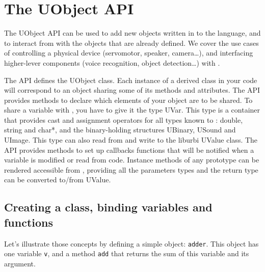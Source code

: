 \chapter{The UObject API}
\label{sec:uob:api}

The UObject API can be used to add new objects written in \Cxx to the
\us language, and to interact from \Cxx with the objects that are
already defined. We cover the use cases of controlling a physical
device (servomotor, speaker, camera\ldots), and interfacing
higher-lever components (voice recognition, object detection\ldots)
with \urbi.

The API defines the UObject class. Each instance of a derived class in
your \Cxx code will correspond to an \us object sharing some of its
methods and attributes. The API provides methods to declare which
elements of your object are to be shared. To share a variable with
\urbi, you have to give it the type UVar. This type is a container
that provides cast and assignment operators for all types known to
\urbi: double, string and char*, and the binary-holding structures
UBinary, USound and UImage. This type can also read from and write to
the liburbi UValue class. The API provides methods to set up callbacks
functions that will be notified when a variable is modified or read
from \urbi code. Instance methods of any prototype can be rendered
accessible from \us, providing all the parameters types and the return
type can be converted to/from UValue.


\section{Creating a class, binding variables and functions}
\label{sec:uob:api:bind}

Let's illustrate those concepts by defining a simple object:
\lstinline{adder}. This object has one variable \lstinline{v}, and a
method \lstinline{add} that returns the sum of this variable and its
argument.

